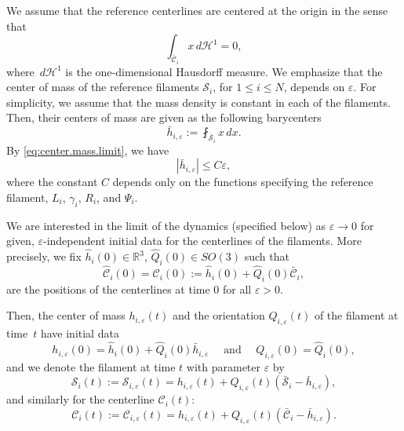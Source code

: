 \documentclass[10pt]{amsart}
\newcommand{\R}{\mathbb{R}}
\let\eps\varepsilon
\newcommand{\cS}{\mathcal{S}}
\newcommand{\dd}{\,d}
\theoremstyle{definition}
\theoremstyle{remark}
\begin{document}
We assume that the reference centerlines are centered at the origin in the sense that\vspace*{-3pt}
\begin{equation} \label{eq:center.mass.limit}
\int_{\bar {\mathcal C}_i} x \dd \mathcal H^1 = 0,
\end{equation}
where $\dd \mathcal{H}^1$ is the one-dimensional Hausdorff measure.
We emphasize that the center of mass of the reference filaments $\mathcal S_i$, for $ 1\leq i \leq N$, depends on $\eps$. For simplicity, we assume that the mass density is constant in each of the filaments. Then, their centers of mass are given as the following barycenters
\begin{equation}
\bar h_{i,\eps} := \fint_{\bar {\cS}_i} x \dd x.
\end{equation}
By \eqref{eq:center.mass.limit}, we have\vspace*{-3pt}
\begin{equation} \label{eq:center.mass.small}
|\bar h_{i,\eps}| \leq C \eps,
\end{equation}
where the constant $C$ depends only on the functions specifying the reference filament, \ie $L_i$, $\gamma_i$, $R_i$, and $\Psi_i$.

We are interested in the limit of the dynamics (specified below) as $\eps \to 0$ for given, $\eps$-independent initial data for the centerlines of the filaments. More precisely,
we fix $\hat h_i(0) \in \R^3$, $\hat Q_i(0) \in SO(3)$ such that
\begin{equation}
\label{dimathC}
\hat{\mathcal C}_i (0) = \mathcal C_i (0) := \hat h_i(0) + \hat Q_i(0) \bar {\mathcal C}_i,
\end{equation}
are the positions of the centerlines at time $0$ for all $\eps >0$.

Then, the center of mass $h_{i,\eps}(t)$ and the orientation $Q_{i,\eps}(t)$ of the filament at time~$t$ have initial data\vspace*{-3pt}
\begin{equation} \label{eq:initial.positions}
h_{i,\eps}(0) = \hat h_i(0) + {\hat Q_{i}(0)} \bar h_{i,\eps} \quad \text{ and } \quad Q_{i,\eps}(0) = \hat Q_i(0),
\end{equation}
and we denote the filament at time $t$ with parameter $\eps$ by\vspace*{-3pt}
\begin{equation} \label{def:Stourne}
\mathcal S_i(t) := \mathcal S_{i,\eps}(t) = h_{i,\eps}(t) + {Q_{i,\eps}}(t) (\bar {\mathcal S}_i - \bar h_{i,\eps}),
\end{equation}
and similarly for the centerline $\mathcal C_i(t)$:\vspace*{-3pt}
\begin{equation*}
\mathcal C_i(t) := \mathcal C_{i,\eps}(t) = h_{i,\eps}(t) + {Q_{i,\eps}}(t) (\bar {\mathcal C}_i - \bar h_{i,\eps}).
\end{equation*}
\end{document}
